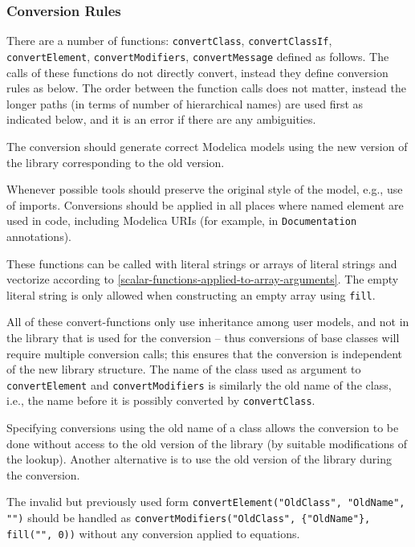 \subsubsection{Conversion Rules}\label{conversion-rules}

There are a number of functions: \lstinline!convertClass!, \lstinline!convertClassIf!, \lstinline!convertElement!, \mbox{\lstinline!convertModifiers!,} \lstinline!convertMessage! defined as follows.
The calls of these functions do not directly convert, instead they define conversion rules as below.
The order between the function calls does not matter, instead the longer paths (in terms of number of hierarchical names) are used first as indicated below, and it is an error if there are any ambiguities.

The conversion should generate correct Modelica models using the new version of the library corresponding to the old version.

\begin{nonnormative}
Whenever possible tools should preserve the original style of the model, e.g., use of imports.
Conversions should be applied in all places where named element are used in code, including Modelica URIs (for example, in \lstinline!Documentation! annotations).
\end{nonnormative}

These functions can be called with literal strings or arrays of literal strings and vectorize according to \cref{scalar-functions-applied-to-array-arguments}.
The empty literal string is only allowed when constructing an empty array using \lstinline!fill!.

All of these convert-functions only use inheritance among user models, and not in the library that is used for the conversion -- thus conversions of base classes will require multiple conversion calls; this ensures that the conversion is independent of the new library structure.
The name of the class used as argument to \lstinline!convertElement! and \lstinline!convertModifiers! is similarly the old name of the class, i.e., the name before it is possibly converted by \lstinline!convertClass!.

\begin{nonnormative}
Specifying conversions using the old name of a class allows the conversion to be done without access to the old version of the library (by suitable modifications of the lookup).
Another alternative is to use the old version of the library during the conversion.

The invalid but previously used form \lstinline!convertElement("OldClass", "OldName", "")! should be handled as \lstinline!convertModifiers("OldClass", {"OldName"}, fill("", 0))! without any conversion applied to equations.
\end{nonnormative}

